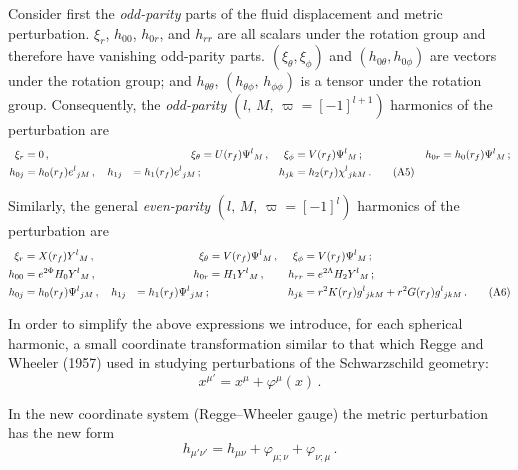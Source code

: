\documentclass[12pt]{article}
\begin{document}
Consider first the \emph{odd-parity} parts of the fluid displacement and metric perturbation.
$\xi_r$, $h_{00}$, $h_{0r}$, and $h_{rr}$ are all scalars under the rotation group and therefore have vanishing
odd-parity parts. $(\xi_\theta, \xi_\phi)$ and $(h_{0\theta}, h_{0\phi})$ are vectors under the rotation group;
and $h_{\theta\theta}$, $(h_{\theta\phi},\, h_{\phi\phi})$ is a tensor under the rotation group.
Consequently, the \emph{odd-parity} $(l,\, M,\, \varpi = [-1]^{l+1})$ harmonics of the perturbation are
%
\begin{subequations}
\begin{align}
\xi_r &= 0 \,,
&\xi_\theta &= U(r_f)\Psi^l{}_{M} \,,
&\xi_\phi &= V(r_f)\Psi^l{}_{M} \,;
&h_{0r} &= h_0(r_f)\Psi^l{}_{M} \,;
\notag\\
h_{0j} &= h_0(r_f)e^l{}_{jM} \,,
\quad
h_{1j} &= h_1(r_f)e^l{}_{jM} \,;
&&
h_{j k} &= h_2(r_f)\chi^l{}_{jkM} \,.
\tag{A5}
\end{align}
\end{subequations}

Similarly, the general \emph{even-parity} $(l,\, M,\, \varpi = [-1]^l)$ harmonics of the perturbation are
%
\begin{subequations}
\begin{align}
\xi_r &= X(r_f)Y^l{}_{M} \,,
&\xi_\theta &= V(r_f)\Psi^l{}_{M} \,,
&\xi_\phi &= V(r_f)\Psi^l{}_{M} \,;
\notag\\
h_{00} &= e^{2\Phi}H_0 Y^l{}_{M} \,,
&h_{0r} &= H_1 Y^l{}_{M} \,,
&h_{rr} &= e^{2\Lambda}H_2 Y^l{}_{M} \,;
\notag\\
h_{0j} &= h_0(r_f)\Psi^l{}_{jM} \,,
\quad
h_{1j} &= h_1(r_f)\Psi^l{}_{jM} \,;
&&
h_{jk} &= r^2 K(r_f)g^l{}_{jkM} + r^2 G(r_f)g^l{}_{jkM} \,.
\tag{A6}
\end{align}
\end{subequations}

In order to simplify the above expressions we introduce, for each spherical harmonic, a small
coordinate transformation similar to that which Regge and Wheeler (1957) used in studying
perturbations of the Schwarzschild geometry:
%
\begin{equation}
x^{\mu'} = x^\mu + \varphi^\mu(x) \,.
\tag{A7}
\end{equation}

In the new coordinate system (Regge--Wheeler gauge) the metric perturbation has the new form
%
\begin{equation}
h_{\mu'\nu'} = h_{\mu\nu} + \varphi_{\mu;\nu} + \varphi_{\nu;\mu} \,.
\tag{A8}
\end{equation}
\end{document}
